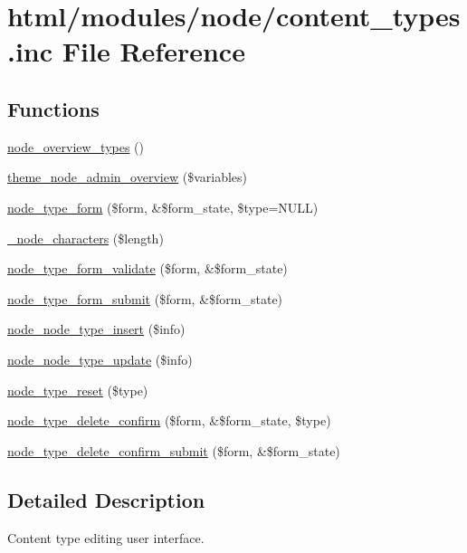 \hypertarget{content__types_8inc}{
\section{html/modules/node/content\_\-types.inc File Reference}
\label{content__types_8inc}
}
\subsection*{Functions}
\begin{DoxyCompactItemize}
\item 
\hyperlink{content__types_8inc_a9530bf9d596b557e8c77f196960dde84}{node\_\-overview\_\-types} ()
\item 
\hyperlink{group__themeable_ga5e362c601057afe19e454d31b708a19e}{theme\_\-node\_\-admin\_\-overview} (\$variables)
\item 
\hyperlink{group__forms_ga488f2cb519f924aa0bd9579d9bb0db49}{node\_\-type\_\-form} (\$form, \&\$form\_\-state, \$type=NULL)
\item 
\hyperlink{content__types_8inc_a7b6024b1fb2150c608e182b317063a97}{\_\-node\_\-characters} (\$length)
\item 
\hyperlink{content__types_8inc_a9bce2bd1a17217d5573cdc8b4465c1f9}{node\_\-type\_\-form\_\-validate} (\$form, \&\$form\_\-state)
\item 
\hyperlink{content__types_8inc_afa55f7240b05f2a2804c11766228a5af}{node\_\-type\_\-form\_\-submit} (\$form, \&\$form\_\-state)
\item 
\hyperlink{content__types_8inc_a0386f57120ddb9f4b77987aa146264cc}{node\_\-node\_\-type\_\-insert} (\$info)
\item 
\hyperlink{content__types_8inc_a88bebabb9aa889ff6ec845b08a340b30}{node\_\-node\_\-type\_\-update} (\$info)
\item 
\hyperlink{content__types_8inc_ace3bf5d2cd2982ff539bff787ae1e44e}{node\_\-type\_\-reset} (\$type)
\item 
\hyperlink{group__forms_ga1ecf3ba8b8cb5469096a74f3e4f18546}{node\_\-type\_\-delete\_\-confirm} (\$form, \&\$form\_\-state, \$type)
\item 
\hyperlink{content__types_8inc_aef7aa2855944bc4869a9956736b2845a}{node\_\-type\_\-delete\_\-confirm\_\-submit} (\$form, \&\$form\_\-state)
\end{DoxyCompactItemize}


\subsection{Detailed Description}
Content type editing user interface. 

